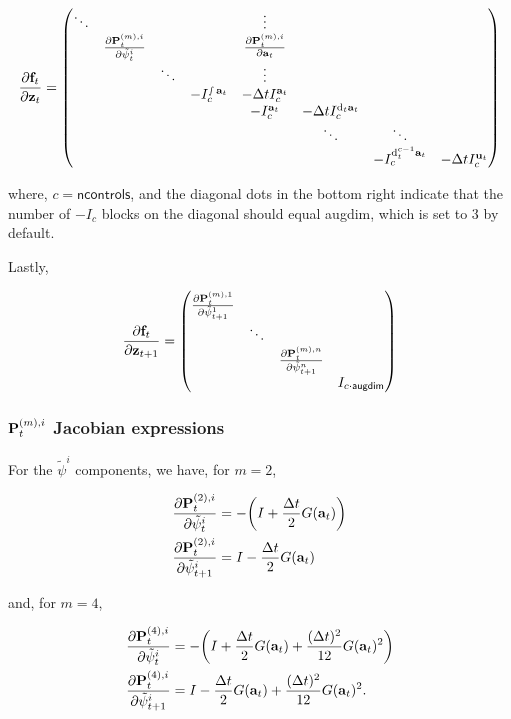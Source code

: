 \documentclass{article}
\newcommand{\isopsi}{\tilde \psi}
\begin{document}
\begin{equation}
  \pdv{\vb{f}_t}{\vb{z}_t} = \mqty(
    \ddots & & & & \vdots \\
    & \pdv{\vb{P}_t^{(m),i}}{\isopsi^i_t} & & & \pdv{\vb{P}_t^{(m),i}}{\vb{a}_t} \\
    & & \ddots & & \vdots \\ 
    & & & -I_{c}^{\smallint \vb{a}_t} & -\Delta t I_{c}^{\vb{a}_t} & \\
    & & & & -I_{c}^{\vb{a}_t} & -\Delta t I_{c}^{\dd_t\vb{a}_t} \\
    & & & & & \ddots & \ddots \\ 
    & & & & & & -I_{c}^{\dd_t^{c-1}\vb{a}_t} & -\Delta tI_{c}^{\vb{u}_t} \\ 
  )
\end{equation}

where, $c = \textsf{ncontrols}$, and the diagonal dots in the bottom right indicate that the number of $-I_c$ blocks on the diagonal should equal \textsf{augdim}, which is set to 3 by default.

\newpage

Lastly,

\begin{equation}
   \pdv{\vb{f}_t}{\vb{z}_{t+1}} = \mqty(
    \pdv{\vb{P}_t^{(m),1}}{\isopsi^1_{t+1}} & & & \\
    & \ddots & & \\
    & & \pdv{\vb{P}_t^{(m),n}}{\isopsi^n_{t+1}} & \\ 
    & & & I_{c \cdot \textsf{augdim}} \\
  )
\end{equation}

\subsubsection*{$\vb{P}^{(m),i}_t$ Jacobian expressions}

For the $\isopsi^i$ components, we have, for $m = 2$,

\begin{align}
  \pdv{\vb{P}_t^{(2),i}}{\isopsi^i_t} &= -\qty(I + \frac{\Delta t}{2}G(\vb{a}_t)) \\
  \pdv{\vb{P}_t^{(2),i}}{\isopsi^i_{t+1}} &= I - \frac{\Delta t}{2}G(\vb{a}_t)
\end{align}

and, for $m = 4$,

\begin{align}
  \pdv{\vb{P}_t^{(4),i}}{\isopsi^i_t} &= -\qty(I + \frac{\Delta t}{2}G(\vb{a}_t) + \frac{(\Delta t)^2}{12} G(\vb{a}_t)^2) \\
  \pdv{\vb{P}_t^{(4),i}}{\isopsi^i_{t+1}} &= I - \frac{\Delta t}{2}G(\vb{a}_t) + \frac{(\Delta t)^2}{12} G(\vb{a}_t)^2.
\end{align}
\end{document}
